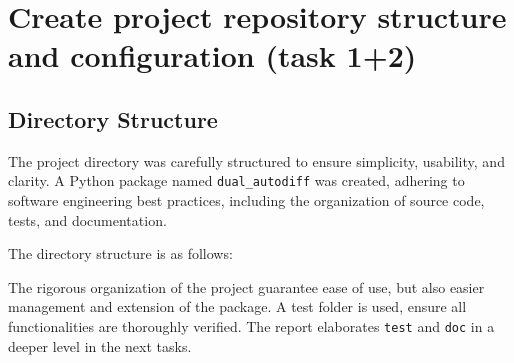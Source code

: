 \documentclass[12.5pt]{article}
\begin{document}
\newpage
\section{Create project repository structure and configuration 
\newline(task 1+2)}

\subsection{Directory Structure}\label{1.1}
The project directory was carefully structured to ensure simplicity, usability, and clarity. A Python package named \texttt{dual\_autodiff} was created, adhering to software engineering best practices, including the organization of source code, tests, and documentation.

The directory structure is as follows:

The rigorous organization of the project guarantee ease of use, but also easier management and extension of the package. A test folder is used, ensure all functionalities are thoroughly verified. The report elaborates \texttt{test} and \texttt{doc} in a deeper level in the next tasks.
\end{document}
